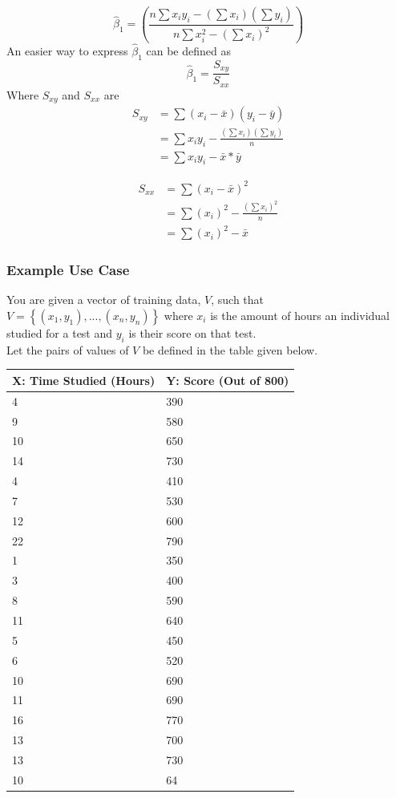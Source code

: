 \documentclass[12pt]{article}
\begin{document}
\begin{equation}
	\hat \beta_1 = \left(\frac{n \sum x_iy_i - (\sum x_i)(\sum y_i)}{n\sum x_i^2 - (\sum x_i)^2}\right)
\end{equation}
An easier way to express $\hat \beta_1$ can be defined as
\begin{equation}
	\hat \beta_1 = \frac{S_{xy}}{S_{xx}}
\end{equation}
Where $S_{xy}$ and $S_{xx}$ are 
\begin{align*}
S_{xy}&= \sum(x_i-\bar x)(y_i-\bar y) \\
	  &= \sum x_iy_i-\frac{(\sum x_i)(\sum y_i)}{n}\\
	  &= \sum x_iy_i-\bar x *\bar y
\end{align*}

\begin{align*}
S_{xx} &= \sum(x_i - \bar x)^2 \\
&= \sum (x_i)^2 - \frac{(\sum x_i)^2}{n}\\
&= \sum (x_i)^2 - \bar x
\end{align*}

\subsubsection{Example Use Case}
You are given a vector of training data, $V$, such that $V = \left \{(x_1,y_1), ... ,(x_n,y_n) \right \}$ where $x_i$ is the amount of hours an individual studied for a test and $y_i$ is their score on that test. \\
Let the pairs of values of $V$ be defined in the table given below.
\begin{center}
    \begin{tabular}{ | l | l |} \hline
	    X: Time Studied (Hours) & Y: Score (Out of 800)  \\ \hline
		    4 & 390 \\ \hline
			9 & 580 \\ \hline
			10 & 650 \\ \hline
			14 & 730 \\ \hline
			4 & 410 \\ \hline
			7 & 530 \\ \hline
			12 & 600 \\ \hline
			22 & 790 \\ \hline
			1 & 350 \\ \hline
			3 & 400 \\ \hline
			8 & 590 \\ \hline
			11 & 640 \\ \hline
			5 & 450 \\ \hline
			6 & 520 \\ \hline
			10 & 690 \\ \hline
			11 & 690 \\ \hline
			16 & 770 \\ \hline
			13 & 700 \\ \hline
			13 & 730 \\ \hline
			10 & 64 \\ \hline
    \end{tabular}
\end{center}
\end{document}
